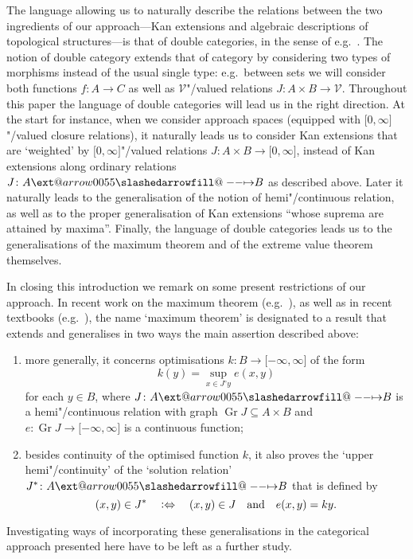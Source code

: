 \documentclass[preprint, a4paper]{elsarticle}
\makeatletter
\def\slashedarrowfill@#1#2#3#4#5{%
  $\m@th\thickmuskip0mu\medmuskip\thickmuskip\thinmuskip\thickmuskip
   \relax#5#1\mkern-7mu%
   \cleaders\hbox{$#5\mkern-2mu#2\mkern-2mu$}\hfill
   \mathclap{#3}\mathclap{#2}%
   \cleaders\hbox{$#5\mkern-2mu#2\mkern-2mu$}\hfill
   \mkern-7mu#4$%
}
\def\rightslashedarrowfill@{%
  \slashedarrowfill@\relbar\relbar\mapstochar\rightarrow}
\newcommand\xslashedrightarrow[2][]{%
  \ext@arrow 0055{\rightslashedarrowfill@}{#1}{#2}}
\def\slashedrightarrow{\xslashedrightarrow{}}
\theoremstyle{definition}
\theoremstyle{remark}
\newcommand\defeq{\mathrel{\vcentcolon\Leftrightarrow}}
\providecommand{\brks}[1]{\lbrack #1 \rbrack}
\providecommand{\rev}[1]{#1^\circ}
\DeclareMathOperator{\Gr}{Gr}
\providecommand{\map}[3]{#1\colon#2\to#3}
\providecommand{\hmap}[3]{#1\colon#2\slashedrightarrow#3}
\providecommand{\catvar}[1]{\mathcal{#1}}
\providecommand{\2}{\mathsf 2}
\providecommand{\V}{\catvar V}
\makeatother
\begin{document}
	The language allowing us to naturally describe the relations between the two ingredients of our approach---Kan extensions and algebraic descriptions of topological structures---is that of double categories, in the sense of e.g.\ \cite{Grandis-Pare04}. The notion of double category extends that of category by considering two types of morphisms instead of the usual single type: e.g.\ between sets we will consider both functions $\map fAC$ as well as $\V$"/valued relations $\map J{A \times B}\V$. Throughout this paper the language of double categories will lead us in the right direction. At the start for instance, when we consider approach spaces (equipped with $\brks{0, \infty}$"/valued closure relations), it naturally leads us to consider Kan extensions that are `weighted' by $\brks{0, \infty}$"/valued relations $\map J{A \times B}\brks{0, \infty}$, instead of Kan extensions along ordinary relations $\hmap JAB$ as described above. Later it naturally leads to the generalisation of the notion of hemi"/continuous relation, as well as to the proper generalisation of Kan extensions ``whose suprema are attained by maxima''. Finally, the language of double categories leads us to the generalisations of the maximum theorem and of the extreme value theorem themselves.
	
	In closing this introduction we remark on some present restrictions of our approach. In recent work on the maximum theorem (e.g.\ \cite{Feinberg-Kasyanov15}), as well as in recent textbooks (e.g.\ \cite{Aliprantis-Border06}), the name `maximum theorem' is designated to a result that extends and generalises in two ways the main assertion described above:
	\begin{enumerate}[label=-]
		\item more generally, it concerns optimisations $\map kB\brks{-\infty, \infty}$ of the form 		\begin{displaymath}
			k(y) = \sup_{x \in \rev Jy} e(x, y)
		\end{displaymath}
		for each $y \in B$, where $\hmap JAB$ is a hemi"/continuous relation with graph $\Gr J \subseteq A \times B$ and $\map e{\Gr J}\brks{-\infty, \infty}$ is a continuous function;

		\item besides continuity of the optimised function $k$, it also proves the `upper hemi"/continuity' of the `solution relation' $\hmap{J^*}AB$ that is defined by 
		\begin{displaymath}
			(x, y) \in J^* \quad \defeq \quad (x, y) \in J \quad \text{and} \quad e(x, y) = ky.
		\end{displaymath}
	\end{enumerate}
	Investigating ways of incorporating these generalisations in the categorical approach presented here have to be left as a further study.
	
\end{document}
